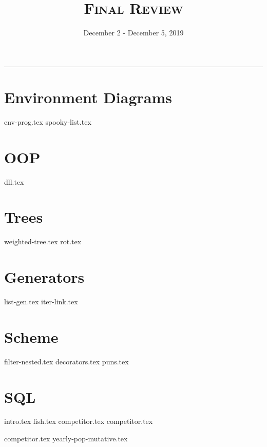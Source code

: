 \documentclass{exam}
\title{\textsc{Final Review}}
\date{December 2 - December 5, 2019}
\begin{document}
\maketitle\rule{\textwidth}{0.15em}
\fontsize{12}{15}\selectfont

\section{Environment Diagrams}
\begin{questions}
{env-prog.tex}
{spooky-list.tex}
\end{questions}

\section{OOP}
\begin{questions}
{dll.tex}
\end{questions}

\section{Trees}
\begin{questions}
{weighted-tree.tex}
{rot.tex}
\end{questions}

\section{Generators}
\begin{questions}
{list-gen.tex}
{iter-link.tex}
\end{questions}

\section{Scheme}
\begin{questions}
{filter-nested.tex}
{decorators.tex}
{puns.tex}
\end{questions}

\section{SQL}
{intro.tex}
{fish.tex}
\newpage
{competitor.tex}
{competitor.tex}

\begin{questions}
{competitor.tex}
{yearly-pop-mutative.tex}
\end{questions}
\end{document}
